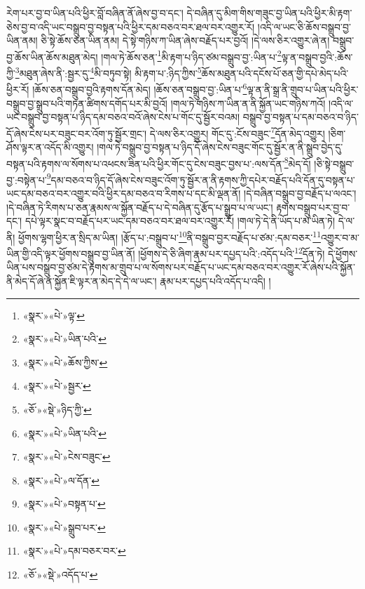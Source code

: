 རེག་པར་བྱ་བ་ཡིན་པའི་ཕྱིར་བློ་བཞིན་ནོ་ཞེས་བྱ་བ་དང་། དེ་བཞིན་དུ་མིག་གིས་གཟུང་བྱ་ཡིན་པའི་ཕྱིར་མི་རྟག་ཅེས་བྱ་བ་འདི་ཡང་བསྒྲུབ་བྱ་བསྟན་པའི་ཕྱིར་དམ་བཅའ་བར་ཐལ་བར་འགྱུར་རོ། །འདི་ལ་ཡང་ཅི་ཆོས་བསྒྲུབ་བྱ་ཡིན་ནམ། ཅི་སྟེ་ཆོས་ཅན་ཡིན་ནམ། དེ་སྟེ་གཉིས་ཀ་ཡིན་ཞེས་བརྗོད་པར་བྱའོ། །དེ་ལས་ཅིར་འགྱུར་ཞེ་ན། བསྒྲུབ་བྱ་ཆོས་ཡིན་ཆོས་མཐུན་མེད། །གལ་ཏེ་ཆོས་ཅན་\footnote{«སྣར་»«པེ་»ལྟ་}མི་རྟག་པ་ཉིད་ཙམ་བསྒྲུབ་བྱ་:ཡིན་པ་\footnote{«སྣར་»«པེ་»ཡིན་པའི་}ལྟ་ན་བསྒྲུབ་བྱའི་:ཆོས་ཀྱི་\footnote{«སྣར་»«པེ་»ཆོས་ཀྱིས་}མཐུན་ཞེས་ནི་:སྦྱར་དུ་\footnote{«སྣར་»«པེ་»སྦྱར་}མི་བཏུབ་སྟེ། མི་རྟག་པ་:ཉིད་ཀྱིས་\footnote{«ཅོ་»«སྡེ་»ཉིད་ཀྱི་}ཆོས་མཐུན་པའི་དངོས་པོ་ཅན་གྱི་དཔེ་མེད་པའི་ཕྱིར་རོ། །ཆོས་ཅན་བསྒྲུབ་བྱའི་རྟགས་དོན་མེད། །ཆོས་ཅན་བསྒྲུབ་བྱ་:ཡིན་པ་\footnote{«སྣར་»«པེ་»ཡིན་པའི་}ལྟ་ན་ནི་སྒྲ་ནི་གྲུབ་པ་ཡིན་པའི་ཕྱིར་བསྒྲུབ་བྱ་སྒྲུབ་པའི་གཏན་ཚིགས་དགོད་པར་མི་བྱའོ། །གལ་ཏེ་གཉིས་ཀ་ཡིན་ན་ནི་སྐྱོན་ཡང་གཉིས་ཀའོ། །འདི་ལ་ཡང་བསྒྲུབ་བྱ་བསྟན་པ་ཉིད་དམ་བཅའ་བའོ་ཞེས་ངེས་པ་གོང་དུ་སྦྱོར་བའམ། བསྒྲུབ་བྱ་བསྟན་པ་དམ་བཅའ་བ་ཉིད་དོ་ཞེས་ངེས་པར་བཟུང་བར་འོག་ཏུ་སྦྱོར་གྲང་། དེ་ལས་ཅིར་འགྱུར། གོང་དུ་:ངོས་བཟུང་\footnote{«སྣར་»«པེ་»ངེས་བཟུང་}དོན་མེད་འགྱུར། །ཅིག་ཤོས་ལྟར་ན་འདོད་མི་འགྱུར། །གལ་ཏེ་བསྒྲུབ་བྱ་བསྟན་པ་ཉིད་དོ་ཞེས་ངེས་བཟུང་གོང་དུ་སྦྱོར་ན་ནི་སྒྲུབ་བྱེད་དུ་བསྟན་པའི་རྟགས་ལ་སོགས་པ་འཕངས་ཟིན་པའི་ཕྱིར་གོང་དུ་ངེས་བཟུང་བྱས་པ་:ལས་དོན་\footnote{«སྣར་»«པེ་»ལ་དོན་}མེད་དོ། །ཅི་སྟེ་བསྒྲུབ་བྱ་:བསྟེན་པ་\footnote{«སྣར་»«པེ་»བསྟན་པ་}དམ་བཅའ་བ་ཉིད་དོ་ཞེས་ངེས་བཟུང་འོག་ཏུ་སྦྱོར་ན་ནི་རྟགས་ཀྱི་དཔེར་བརྗོད་པའི་དོན་དུ་བསྟན་པ་ཡང་དམ་བཅའ་བར་འགྱུར་བའི་ཕྱིར་དམ་བཅའ་བ་རིགས་པ་དང་མི་ལྡན་ནོ། །དེ་བཞིན་བསྒྲུབ་བྱ་བརྗོད་པ་ལའང་། །དེ་བཞིན་ཏེ་རིགས་པ་ཅན་རྣམས་ལ་སྐྱོན་བརྗོད་པ་དེ་བཞིན་དུ་རྩོད་པ་སྒྲུབ་པ་ལ་ཡང་། རྟགས་བསྒྲུབ་པར་བྱ་བ་དང་། དཔེ་ལྟར་སྣང་བ་བརྗོད་པར་ཡང་དམ་བཅའ་བར་ཐལ་བར་འགྱུར་རོ། །གལ་ཏེ་དེ་ནི་ཡོད་པ་མ་ཡིན་ཏེ། དེ་ལ་ནི། ཕྱོགས་ལྷག་ཕྱིར་ན་སྲིད་མ་ཡིན། །རྩོད་པ་:བསྒྲུབ་པ་\footnote{«སྣར་»«པེ་»སྒྲུབ་པར་}ནི་བསྒྲུབ་བྱར་བརྗོད་པ་ཙམ་:དམ་བཅར་\footnote{«སྣར་»«པེ་»དམ་བཅར་བར་}འགྱུར་བ་མ་ཡིན་གྱི་འདི་ལྟར་ཕྱོགས་བསྒྲུབ་བྱ་ཡིན་ནོ། །ཕྱོགས་དེ་ཅི་ཞིག་རྣམ་པར་དཔྱད་པའི་:འདོད་པའི་\footnote{«ཅོ་»«སྡེ་»འདོད་པ་}དོན་ཏེ། དེ་ཕྱོགས་ཡིན་པས་བསྒྲུབ་བྱ་ཙམ་དེ་རྟགས་མ་གྲུབ་པ་ལ་སོགས་པར་བརྗོད་པ་ཡང་དམ་བཅའ་བར་འགྱུར་རོ་ཞེས་པའི་སྐྱོན་ནི་མེད་དོ་ཞེ་ན་སྐྱོན་ཇི་ལྟར་ན་མེད་དེ་དེ་ལ་ཡང་། རྣམ་པར་དཔྱད་པའི་འདོད་པ་འདི། །
